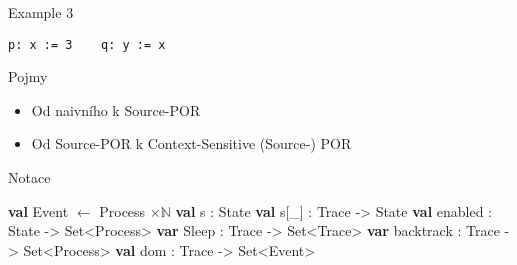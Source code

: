 \documentclass[11pt]{beamer}
\begin{document}
\begin{frame}[fragile]{Example 3}
\begin{verbatim}
p: x := 3    q: y := x
\end{verbatim}
\end{frame}

%
\begin{frame}{Pojmy}
\end{frame}


\begin{frame}
\begin{itemize}
\item Od naivního k Source-POR
\item Od Source-POR k Context-Sensitive (Source-) POR
\end{itemize}
\end{frame}

\begin{frame}[fragile]{Notace}
\begin{algorithmic}
\pause \State \textbf{val} Event $ \gets $ Process $ \times \mathbb{N}$
\pause \State \textbf{val} s : State \pause {}
\pause \State \textbf{val} s[\_] : Trace -> State \pause {}
\pause \State \textbf{val} enabled : State -> Set<Process>
\pause \State \textbf{var} Sleep : Trace -> Set<Trace> \pause {}
\pause \State \textbf{var} backtrack : Trace -> Set<Process>
\pause \State \textbf{val} dom : Trace -> Set<Event>
\end{algorithmic}
\end{frame}
\end{document}

